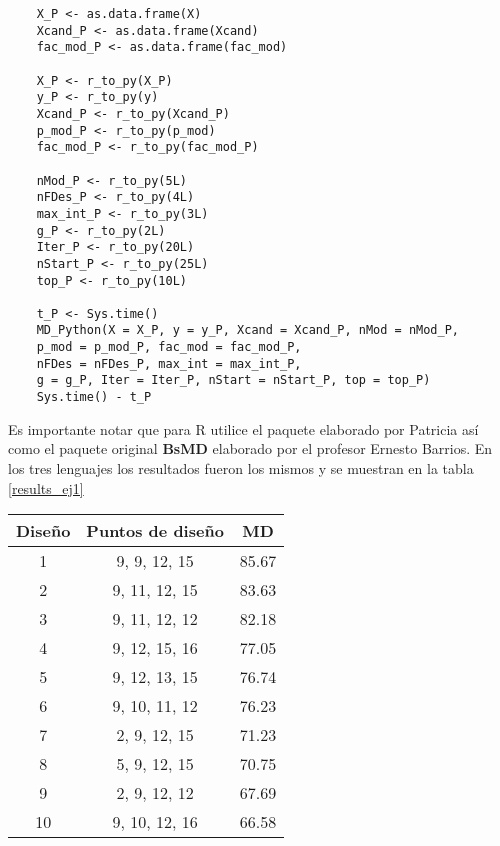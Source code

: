 \begin{verbatim}
	X_P <- as.data.frame(X)
	Xcand_P <- as.data.frame(Xcand)
	fac_mod_P <- as.data.frame(fac_mod)
	
	X_P <- r_to_py(X_P)
	y_P <- r_to_py(y) 
	Xcand_P <- r_to_py(Xcand_P)
	p_mod_P <- r_to_py(p_mod)
	fac_mod_P <- r_to_py(fac_mod_P)
	
	nMod_P <- r_to_py(5L)
	nFDes_P <- r_to_py(4L)
	max_int_P <- r_to_py(3L)
	g_P <- r_to_py(2L)
	Iter_P <- r_to_py(20L)
	nStart_P <- r_to_py(25L)
	top_P <- r_to_py(10L)
	
	t_P <- Sys.time()
	MD_Python(X = X_P, y = y_P, Xcand = Xcand_P, nMod = nMod_P, 
	p_mod = p_mod_P, fac_mod = fac_mod_P, 
	nFDes = nFDes_P, max_int = max_int_P, 
	g = g_P, Iter = Iter_P, nStart = nStart_P, top = top_P)
	Sys.time() - t_P
\end{verbatim}

Es importante notar que para R utilice el paquete elaborado por Patricia así como el paquete original \textbf{BsMD} elaborado por el profesor Ernesto Barrios. En los tres lenguajes los resultados fueron los mismos y se muestran en la tabla \ref{results_ej1}

\begin{center}
	\begin{tabular}{cc|c}
		Diseño & Puntos de diseño & MD \\
		\hline
		1 & 9, 9, 12, 15 & 85.67 \\
		
		2 & 9, 11, 12, 15 & 83.63 \\
		
		3 &  9, 11, 12, 12 & 82.18 \\
		
		4 & 9, 12, 15, 16 & 77.05 \\
		
		5 & 9, 12, 13, 15 & 76.74 \\
		
		6 & 9, 10, 11, 12 & 76.23 \\
		
		7 & 2, 9, 12, 15 & 71.23 \\
		
		8 & 5, 9, 12, 15 & 70.75 \\
		
		9 & 2, 9, 12, 12 & 67.69 \\
		
		10 & 9, 10, 12, 16 & 66.58 \\
		
	\end{tabular}
	 \label{results_ej1}
\end{center}

